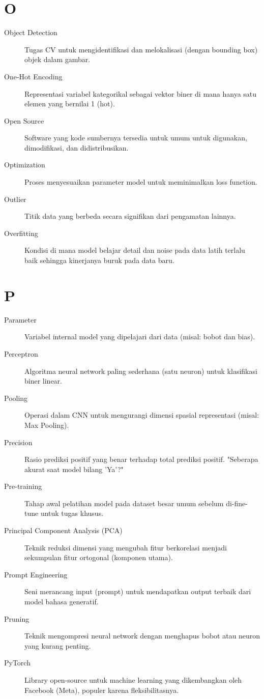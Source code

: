 \section*{O}
\begin{description}
    \item[Object Detection] Tugas CV untuk mengidentifikasi dan melokalisasi (dengan bounding box) objek dalam gambar.
    \item[One-Hot Encoding] Representasi variabel kategorikal sebagai vektor biner di mana hanya satu elemen yang bernilai 1 (hot).
    \item[Open Source] Software yang kode sumbernya tersedia untuk umum untuk digunakan, dimodifikasi, dan didistribusikan.
    \item[Optimization] Proses menyesuaikan parameter model untuk meminimalkan loss function.
    \item[Outlier] Titik data yang berbeda secara signifikan dari pengamatan lainnya.
    \item[Overfitting] Kondisi di mana model belajar detail dan noise pada data latih terlalu baik sehingga kinerjanya buruk pada data baru.
\end{description}

\section*{P}
\begin{description}
    \item[Parameter] Variabel internal model yang dipelajari dari data (misal: bobot dan bias).
    \item[Perceptron] Algoritma neural network paling sederhana (satu neuron) untuk klasifikasi biner linear.
    \item[Pooling] Operasi dalam CNN untuk mengurangi dimensi spasial representasi (misal: Max Pooling).
    \item[Precision] Rasio prediksi positif yang benar terhadap total prediksi positif. "Seberapa akurat saat model bilang 'Ya'?"
    \item[Pre-training] Tahap awal pelatihan model pada dataset besar umum sebelum di-fine-tune untuk tugas khusus.
    \item[Principal Component Analysis (PCA)] Teknik reduksi dimensi yang mengubah fitur berkorelasi menjadi sekumpulan fitur ortogonal (komponen utama).
    \item[Prompt Engineering] Seni merancang input (prompt) untuk mendapatkan output terbaik dari model bahasa generatif.
    \item[Pruning] Teknik mengompresi neural network dengan menghapus bobot atau neuron yang kurang penting.
    \item[PyTorch] Library open-source untuk machine learning yang dikembangkan oleh Facebook (Meta), populer karena fleksibilitasnya.
\end{description}

